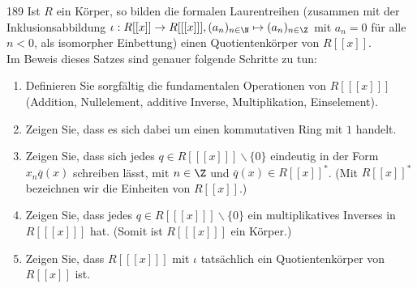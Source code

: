 \begin{algebraUE}{189}
Ist $R$ ein Körper, so bilden die formalen Laurentreihen (zusammen mit der
Inklusionsabbildung $\iota: R[[x]] \rightarrow R[[[x]]], (a_n)_{n \in \N}
\mapsto (a_n)_{n \in \Z}$ mit $a_n = 0$ für alle $n < 0$, als isomorpher
Einbettung) einen Quotientenkörper von $R[[x]]$. \\
Im Beweis dieses Satzes sind genauer folgende Schritte zu tun:
\begin{enumerate}
  \item Definieren Sie sorgfältig die fundamentalen Operationen von $R[[[x]]]$
  (Addition, Nullelement, additive Inverse, Multiplikation, Einselement).
  \item Zeigen Sie, dass es sich dabei um einen kommutativen Ring mit $1$ handelt.
  \item Zeigen Sie, dass sich jedes $q \in R[[[x]]]\backslash \{0\}$ eindeutig in
  der Form $x_n\overline{q}(x)$ schreiben lässt, mit $n \in \Z$ und $\overline{q}(x) \in R[[x]]^*$.
  (Mit $R[[x]]^*$ bezeichnen wir die Einheiten von $R[[x]]$.)
  \item Zeigen Sie, dass jedes $q \in R[[[x]]]\backslash\{0\}$ ein multiplikatives
  Inverses in $R[[[x]]]$ hat. (Somit ist $R[[[x]]]$ ein Körper.)
  \item Zeigen Sie, dass $R[[[x]]]$ mit $\iota$ tatsächlich ein Quotientenkörper
  von $R[[x]]$ ist.
\end{enumerate}
\end{algebraUE}
